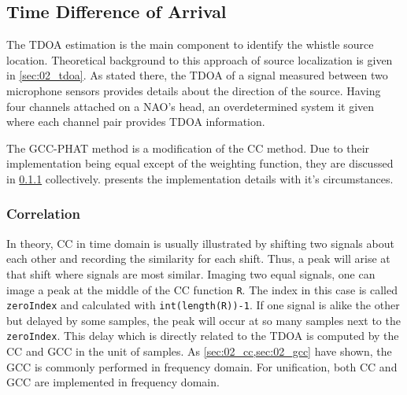 \subsection{Time Difference of Arrival}
\label{subsec:03_tdoa}

The \ac{TDOA} estimation is the main component to identify the
whistle source location.
Theoretical background to this approach of source localization is
given in \cref{sec:02_tdoa}.
As stated there, the \ac{TDOA} of a signal measured between two microphone sensors
provides details about the direction of the source.
Having four channels attached on a NAO's head, an overdetermined system it
given where each channel pair provides \ac{TDOA} information.

The \ac{GCC-PHAT} method is a modification of the \ac{CC} method.
Due to their implementation being equal except of the weighting function,
they are discussed in \cref{subsubsec:03_cc} collectively.
 presents the implementation details with it's
circumstances.

\subsubsection{Correlation}
\label{subsubsec:03_cc}

In theory, \acf{CC} in time domain is usually illustrated by shifting
two signals about each other and recording the similarity for each shift.
Thus, a peak will arise at that shift where signals are most similar.
Imaging two equal signals, one can image a peak at the middle of the \ac{CC} function
\lstinline!R!.
The index in this case is called \lstinline!zeroIndex! and calculated with
\lstinline!int(length(R))-1!.
If one signal is alike the other but delayed by some samples, the peak will
occur at so many samples next to the \lstinline!zeroIndex!.
This delay which is directly related to the \ac{TDOA} is computed
by the \ac{CC} and \ac{GCC} in the unit of samples.
As \cref{sec:02_cc,sec:02_gcc} have shown, the \ac{GCC} is commonly performed
in frequency domain.
For unification, both \ac{CC} and \ac{GCC} are implemented in frequency domain.

